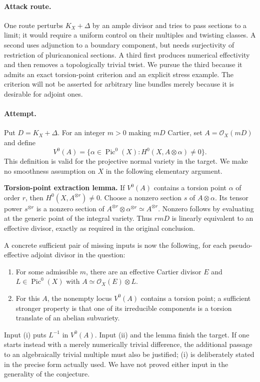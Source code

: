 \documentclass[11pt,a4paper]{article}
\numberwithin{equation}{section}
\begin{document}
\paragraph{Attack route.}
One route perturbs $K_X+\Delta$ by an ample divisor and tries to pass sections to a limit; it would require a uniform control on their multiples and twisting classes. A second uses adjunction to a boundary component, but needs surjectivity of restriction of pluricanonical sections. A third first produces numerical effectivity and then removes a topologically trivial twist. We pursue the third because it admits an exact torsion-point criterion and an explicit stress example. The criterion will not be asserted for arbitrary line bundles merely because it is desirable for adjoint ones.

\paragraph{Attempt.}
Put $D=K_X+\Delta$. For an integer $m>0$ making $mD$ Cartier, set $A=\mathcal O_X(mD)$ and define
\[
 V^0(A)=\{\alpha\in\operatorname{Pic}^0(X):H^0(X,A\otimes\alpha)\ne0\}.
\]
This definition is valid for the projective normal variety in the target. We make no smoothness assumption on $X$ in the following elementary argument.

\textbf{Torsion-point extraction lemma.} If $V^0(A)$ contains a torsion point $\alpha$ of order $r$, then $H^0(X,A^{\otimes r})\ne0$.
Choose a nonzero section $s$ of $A\otimes\alpha$. Its tensor power $s^{\otimes r}$ is a nonzero section of $A^{\otimes r}\otimes\alpha^{\otimes r}\simeq A^{\otimes r}$. Nonzero follows by evaluating at the generic point of the integral variety. Thus $rmD$ is linearly equivalent to an effective divisor, exactly as required in the original conclusion.

A concrete sufficient pair of missing inputs is now the following, for each pseudo-effective adjoint divisor in the question:
\begin{enumerate}[label=(\roman*),leftmargin=2.5em]
\item For some admissible $m$, there are an effective Cartier divisor $E$ and $L\in\operatorname{Pic}^0(X)$ with $A\simeq\mathcal O_X(E)\otimes L$.
\item For this $A$, the nonempty locus $V^0(A)$ contains a torsion point; a sufficient stronger property is that one of its irreducible components is a torsion translate of an abelian subvariety.
\end{enumerate}
Input (i) puts $L^{-1}$ in $V^0(A)$. Input (ii) and the lemma finish the target. If one starts instead with a merely numerically trivial difference, the additional passage to an algebraically trivial multiple must also be justified; (i) is deliberately stated in the precise form actually used. We have not proved either input in the generality of the conjecture.
\end{document}
